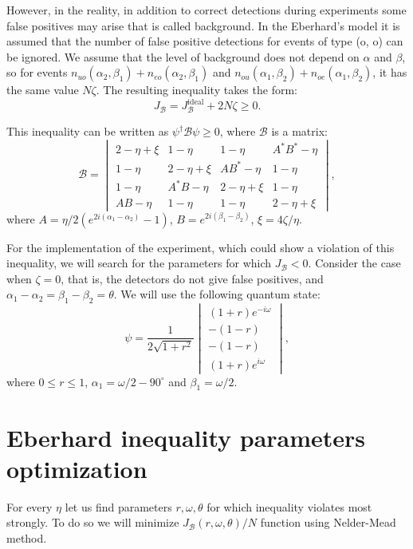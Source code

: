 \documentclass[11pt]{article}
\begin{document}
However, in the reality, in addition to correct detections during experiments some false positives may arise that is called background. In the Eberhard's model it is assumed that the number of false positive detections for events of type (o, o) can be ignored. We assume that the level of background does not depend on $\alpha$ and $\beta$, so for events $n_{uo}(\alpha_2, \beta_1) + n_{eo}(\alpha_2, \beta_1)$ and $n_{ou}(\alpha_1, \beta_2) + n_{oe}(\alpha_1, \beta_2)$, it has the same value $N\zeta$. The resulting inequality takes the form:
\[
J_{\mathcal{B}} = J_{\mathcal{B}}^{\mbox{ideal}} + 2N\zeta \geq 0.
\]

This inequality can be written as $\psi^\dagger\mathcal{B}\psi \geq 0$, where $\mathcal{B}$ is a matrix:
\[
\mathcal{B} = 
\begin{vmatrix}
2 - \eta + \xi & 1 - \eta & 1 - \eta & A^*B^* - \eta\\
1 - \eta & 2 - \eta + \xi & AB^* - \eta & 1 - \eta\\
1 - \eta & A^*B - \eta & 2 - \eta + \xi & 1 - \eta\\
AB - \eta & 1 - \eta & 1 - \eta & 2 - \eta + \xi
\end{vmatrix},
\]
where $A = \eta/2(e^{2i(\alpha_1-\alpha_2)} - 1)$, $B = e^{2i(\beta_1 - \beta_2)}$, $\xi = 4\zeta/\eta$.

For the implementation of the experiment, which could show a violation of this inequality, we will search for the parameters for which $J_{\mathcal{B}} < 0$. Consider the case when $\zeta = 0$, that is, the detectors do not give false positives, and $\alpha_1 - \alpha_2 = \beta_1 - \beta_2 = \theta$. We will use the following quantum state:
\[
\psi = \frac{1}{2\sqrt{1 + r^2}}
\begin{vmatrix}
(1+r)e^{-i\omega}\\
-(1 - r)\\
-(1 - r)\\
(1 + r)e^{i\omega}
\end{vmatrix},
\]
where $0 \leq r \leq 1$, $\alpha_1 = \omega / 2 - 90^\circ$ and $\beta_1 = \omega / 2$.


\section{Eberhard inequality parameters optimization}
For every $\eta$ let us find parameters $r, \omega, \theta$ for which inequality violates most strongly.
To do so we will minimize $J_{\mathcal{B}}(r, \omega, \theta) / N$ function using Nelder-Mead method.
\end{document}
